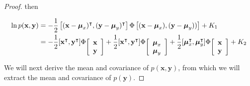 \begin{proof}
    \noindent then

    \begin{align}
        \ln p(\mathbf{x},\mathbf{y})&=-\frac{1}{2}\left[(\mathbf{x}-\boldsymbol{\mu}_x)^\intercal,(\mathbf{y}-\boldsymbol{\mu}_y)^\intercal\right]\Phi\left[(\mathbf{x}-\boldsymbol{\mu}_x),(\mathbf{y}-\boldsymbol{\mu}_y))\right]+K_1\nonumber\\
                                    &=-\frac{1}{2}[\mathbf{x}^\intercal,\mathbf{y}^\intercal]\Phi\raisebox{-0.7em}{$\left[\begin{array}{c}\mathbf{x}\\\mathbf{y}\end{array}\right]$}+\frac{1}{2}[\mathbf{x}^\intercal,\mathbf{y}^\intercal]\Phi\raisebox{-0.7em}{$\left[\begin{array}{c}\boldsymbol{\mu}_x\\\boldsymbol{\mu}_y\end{array}\right]$}+\frac{1}{2}[\boldsymbol{\mu}_x^\intercal,\boldsymbol{\mu}_y^\intercal]\Phi\raisebox{-0.7em}{$\left[\begin{array}{c}\mathbf{x}\\\mathbf{y}\end{array}\right]$}+K_2
    \end{align}

    We will next derive
    the mean and covariance of $p(\mathbf{x},\mathbf{y})$, from which we will
    extract the mean and covariance of $p(\mathbf{y})$.

\end{proof}
